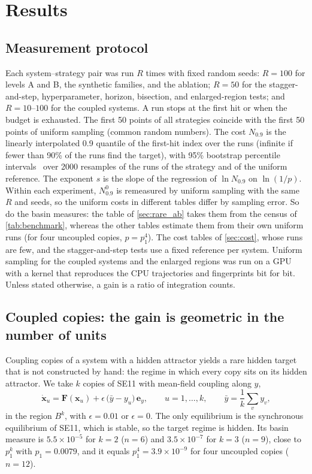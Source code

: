 \section{Results}\label{sec:results}

\subsection{Measurement protocol}\label{sec:measure}

Each system--strategy pair was run $R$ times with fixed random seeds: $R=100$ for levels A and B, the synthetic families, and the ablation; $R=50$ for the stagger-and-step, hyperparameter, horizon, bisection, and enlarged-region tests; and $R=10$--$100$ for the coupled systems. A run stops at the first hit or when the budget is exhausted. The first 50 points of all strategies coincide with the first 50 points of uniform sampling (common random numbers). The cost $N_{0.9}$ is the linearly interpolated 0.9 quantile of the first-hit index over the runs (infinite if fewer than 90\% of the runs find the target), with 95\% bootstrap percentile intervals~\cite{EfronTibshirani1994} over 2000 resamples of the runs of the strategy and of the uniform reference. The exponent $s$ is the slope of the regression of $\ln N_{0.9}$ on $\ln(1/p)$. Within each experiment, $N^0_{0.9}$ is remeasured by uniform sampling with the same $R$ and seeds, so the uniform costs in different tables differ by sampling error. So do the basin measures: the table of \cref{sec:rare_ab} takes them from the census of \cref{tab:benchmark}, whereas the other tables estimate them from their own uniform runs (for four uncoupled copies, $p=p_1^4$). The cost tables of \cref{sec:cost}, whose runs are few, and the stagger-and-step tests use a fixed reference per system. Uniform sampling for the coupled systems and the enlarged regions was run on a GPU with a kernel that reproduces the CPU trajectories and fingerprints bit for bit. Unless stated otherwise, a gain is a ratio of integration counts.

\subsection{Coupled copies: the gain is geometric in the number of units}\label{sec:coupled}

Coupling copies of a system with a hidden attractor yields a rare hidden target that is not constructed by hand: the regime in which every copy sits on its hidden attractor. We take $k$ copies of SE11 with mean-field coupling along $y$,
\begin{equation}
\dot{\bm x}_u=\bm F(\bm x_u)+\epsilon\,\bigl(\bar y-y_u\bigr)\,\bm e_y,\qquad u=1,\dots,k,\qquad \bar y=\frac1k\sum_{v}y_v,
\label{eq:coupled}
\end{equation}
in the region $B^k$, with $\epsilon=0.01$ or $\epsilon=0$. The only equilibrium is the synchronous equilibrium of SE11, which is stable, so the target regime is hidden. Its basin measure is $5.5\times10^{-5}$ for $k=2$ ($n=6$) and $3.5\times10^{-7}$ for $k=3$ ($n=9$), close to $p_1^k$ with $p_1=0.0079$, and it equals $p_1^4=3.9\times10^{-9}$ for four uncoupled copies ($n=12$).

